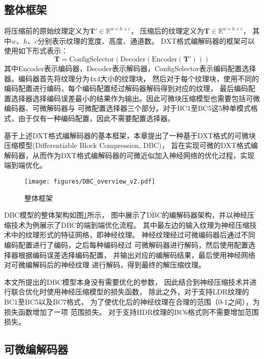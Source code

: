 \subsection{整体框架}

将压缩前的原始纹理定义为$\mathbf{T}'\in \mathbb{R}^{w\times h\times c}$，
压缩后的纹理定义为$\mathbf{T}\in \mathbb{R}^{w\times h\times c}$，
其中$w$、$h$、$c$分别表示纹理的宽度、高度、通道数。
DXT格式编解码器的框架可以使用如下形式表示：
\begin{equation}
    \mathbf{T}=\text{ConfigSelector}(\text{Decoder}(\text{Encoder}(\mathbf{T}')))
\end{equation}
其中Encoder表示编码器，Decoder表示解码器，ConfigSelector表示编码配置选择器。编码器首先将纹理分为4x4大小的纹理块，
然后对于每个纹理块，使用不同的编码配置进行编码，每个编码配置经过解码器解码得到对应的纹理，
最后编码配置选择器选择编码误差最小的结果作为输出。因此可微块压缩模型也需要包括可微编码器、可微解码器与
可微配置选择器三个部分。对于BC1至BC5这5种单模式格式，由于仅有一种编码配置，因此不需要配置选择器。

基于上述DXT格式编解码器的基本框架，本章提出了一种基于DXT格式的可微块压缩模型(Differentiable Block Compression, DBC)， 
旨在实现可微的DXT格式编解码器，从而作为DXT格式编解码器的可微近似加入神经网络的优化过程，实现端到端优化。

\begin{figure}[htbp]
    \centering
    \texttt{[image: figures/DBC\_overview\_v2.pdf]}
    \caption{整体框架}
    \label{fig:DBC_overview}
\end{figure}

DBC模型的整体架构如图\ref{fig:DBC_overview}所示，
图中展示了DBC的编解码器架构，并以神经压缩技术为例展示了DBC的端到端优化流程。
其中最左边的输入纹理为神经压缩技术中的纹理形式的特征网格，即神经纹理。
神经纹理经过可微编码器后通过不同编码配置进行了编码，之后每种编码经过
可微解码器进行解码，然后使用配置选择器根据编码误差选择编码配置，
并输出对应的编解码结果，最后使用神经网络对可微编解码后的神经纹理
进行解码，得到最终的解压缩纹理。

本文所提出的DBC模型本身没有需要优化的参数，
因此结合到神经压缩技术并进行联合优化时使用神经压缩模型的损失函数，
除此之外，对于支持LDR纹理的BC1至BC5以及BC7格式，
为了使优化后的神经纹理在合理的范围（0-1之间），为损失函数增加了一项
范围损失。
对于支持HDR纹理的BC6格式则不需要增加范围损失。


\subsection{可微编解码器}


